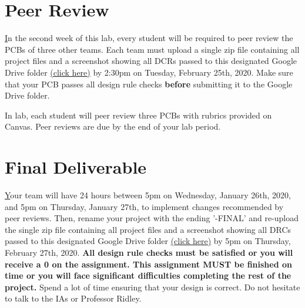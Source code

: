 \documentclass[12pt]{article}
\begin{document}
    \section*{Peer Review}
    \href{https://drive.google.com/drive/folders/1HiCb5Kfc1rcL4PkWGpplv0pV3mDflQRK?usp=sharing}
    In the second week of this lab, every student will be required to peer review the PCBs of three other teams. Each team must upload a single zip file containing all project files and a screenshot showing all DCRs passed to this designated Google Drive folder \href{https://drive.google.com/drive/folders/1HiCb5Kfc1rcL4PkWGpplv0pV3mDflQRK?usp=sharing}{(click here)} by 2:30pm on Tuesday, February 25th, 2020. Make sure that your PCB passes all design rule checks \textbf{before} submitting it to the Google Drive folder.
    
    In lab, each student will peer review three PCBs with rubrics provided on Canvas. Peer reviews are due by the end of your lab period.
    
    \section*{Final Deliverable}
    \href{https://drive.google.com/drive/folders/1HiCb5Kfc1rcL4PkWGpplv0pV3mDflQRK?usp=sharing}
    Your team will have 24 hours between 5pm on Wednesday, January 26th, 2020, and 5pm on Thursday, January 27th, to implement changes recommended by peer reviews. Then, rename your project with the ending '-FINAL' and re-upload the single zip file containing all project files and a screenshot showing all DRCs passed to this designated Google Drive folder \href{https://drive.google.com/drive/folders/1HiCb5Kfc1rcL4PkWGpplv0pV3mDflQRK?usp=sharing}{(click here)} by 5pm on Thursday, February 27th, 2020. \textbf{All design rule checks must be satisfied or you will receive a 0 on the assignment. This assignment MUST be finished on time or you will face significant difficulties completing the rest of the project.} Spend a lot of time ensuring that your design is correct. Do not hesitate to talk to the IAs or Professor Ridley.
    
\end{document}
